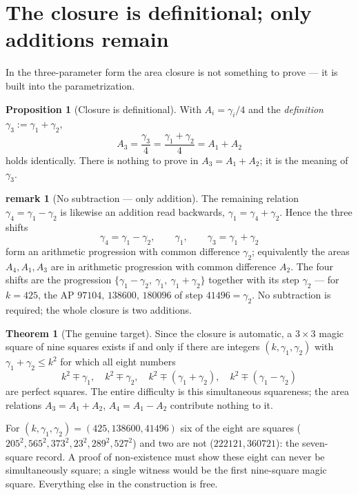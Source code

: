 \documentclass[11pt]{article}
\theoremstyle{definition}
\newtheorem{proposition}{Proposition}
\newtheorem{theorem}{Theorem}
\newtheorem{remark}{remark}
\begin{document}
\section{The closure is definitional; only additions remain}

In the three-parameter form the area closure is not something to prove --- it is
built into the parametrization.

\begin{proposition}[Closure is definitional]\label{prop:defclosure}
With $A_i=\gamma_i/4$ and the \emph{definition} $\gamma_3:=\gamma_1+\gamma_2$,
\[
  A_3=\frac{\gamma_3}{4}=\frac{\gamma_1+\gamma_2}{4}=A_1+A_2
\]
holds identically. There is nothing to prove in $A_3=A_1+A_2$; it is the meaning of
$\gamma_3$.
\end{proposition}

\begin{remark}[No subtraction --- only addition]
The remaining relation $\gamma_4=\gamma_1-\gamma_2$ is likewise an addition read
backwards, $\gamma_1=\gamma_4+\gamma_2$. Hence the three shifts
\[
  \gamma_4=\gamma_1-\gamma_2,\qquad \gamma_1,\qquad \gamma_3=\gamma_1+\gamma_2
\]
form an arithmetic progression with common difference $\gamma_2$; equivalently the
areas $A_4,A_1,A_3$ are in arithmetic progression with common difference $A_2$. The
four shifts are the progression $\{\gamma_1-\gamma_2,\ \gamma_1,\ \gamma_1+\gamma_2\}$
together with its step $\gamma_2$ --- for $k=425$, the AP $97104,\,138600,\,180096$
of step $41496=\gamma_2$. No subtraction is required; the whole closure is two
additions.
\end{remark}

\begin{theorem}[The genuine target]\label{thm:target}
Since the closure is automatic, a $3\times3$ magic square of nine squares exists
if and only if there are integers $(k,\gamma_1,\gamma_2)$ with $\gamma_1+\gamma_2\le
k^{2}$ for which all eight numbers
\[
  k^{2}\mp\gamma_1,\quad k^{2}\mp\gamma_2,\quad
  k^{2}\mp(\gamma_1+\gamma_2),\quad k^{2}\mp(\gamma_1-\gamma_2)
\]
are perfect squares. The entire difficulty is this simultaneous squareness; the
area relations $A_3=A_1+A_2$, $A_4=A_1-A_2$ contribute nothing to it.
\end{theorem}

\noindent For $(k,\gamma_1,\gamma_2)=(425,138600,41496)$ six of the eight are
squares ($205^2,565^2,373^2,23^2,289^2,527^2$) and two are not ($222121,360721$):
the seven-square record. A proof of non-existence must show these eight can never
be simultaneously square; a single witness would be the first nine-square magic
square. Everything else in the construction is free.
\end{document}
